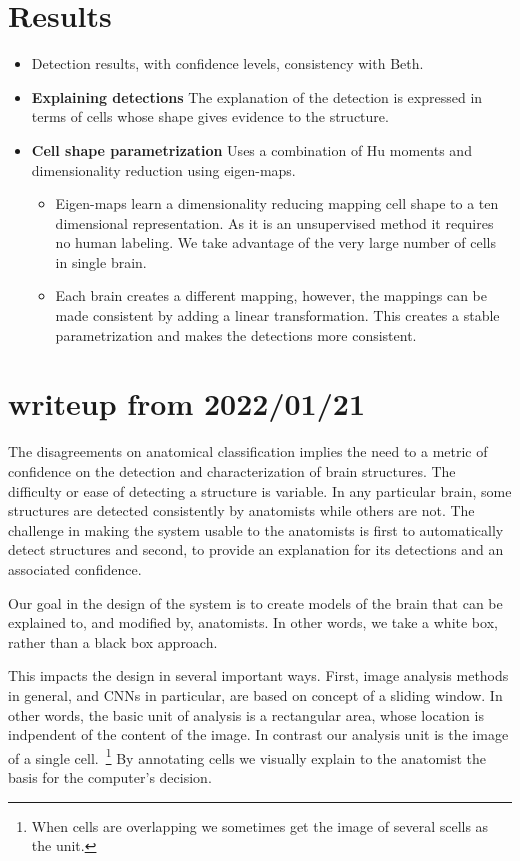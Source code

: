 \documentclass[runningheads]{llncs}
\begin{document}
\section{Results}
\begin{itemize}
    \item Detection results, with confidence levels, consistency with Beth.
    \item {\bf Explaining detections} The explanation of the detection is expressed in terms of cells whose shape gives evidence to the structure.
\item {\bf Cell shape parametrization} Uses a combination of Hu moments and dimensionality reduction using eigen-maps.
\begin{itemize}
    \item Eigen-maps learn a dimensionality reducing mapping cell shape to a ten dimensional representation.
    As it is an unsupervised method it requires no human labeling. We take advantage of the very large number of cells in single brain.
    \item Each brain creates a different mapping, however, the mappings can be made consistent by adding a linear transformation. This creates a stable parametrization and makes the detections more consistent.
\end{itemize}

\end{itemize}


\iffalse
\section{writeup from 2022/01/21}
The disagreements on anatomical classification implies the need to a metric of confidence on the detection and characterization of brain structures.
The difficulty or ease of detecting a structure is variable. 
In any particular brain, some structures are detected consistently by anatomists while others are not.
The challenge in making the system usable to the anatomists is first to automatically detect structures and second, to provide an explanation for its detections and an associated confidence.

Our goal in the design of the system is to create models of the brain
that can be explained to, and modified by, anatomists. In other words,
we take a white box, rather than a black box approach.

This impacts the design in several important ways. First, image
analysis methods in general, and CNNs in particular, are based on
concept of a sliding window. In other words, the basic unit of
analysis is a rectangular area, whose location is indpendent of the
content of the image. In contrast our analysis unit is the image of a
single cell.~\footnote{When cells are overlapping we sometimes get
  the image of several scells as the unit.} By annotating cells we
visually explain to the anatomist the basis for the computer's
decision.
\end{document}
